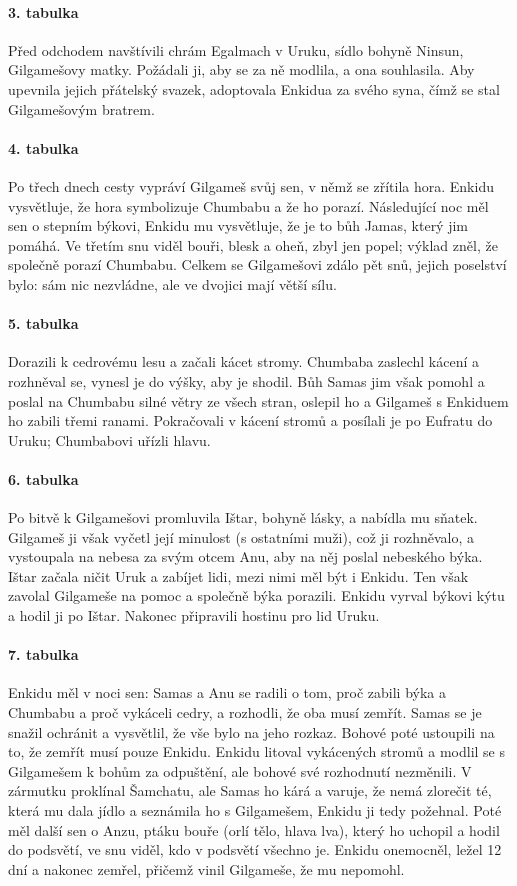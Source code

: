 \documentclass[12pt, a4paper]{article}
\begin{document}
\paragraph{3. tabulka}
Před odchodem navštívili chrám Egalmach v Uruku, sídlo bohyně Ninsun, Gilgamešovy matky. Požádali ji, aby se za ně modlila, a ona souhlasila. Aby upevnila jejich přátelský svazek, adoptovala Enkidua za svého syna, čímž se stal Gilgamešovým bratrem.

\paragraph{4. tabulka}
Po třech dnech cesty vypráví Gilgameš svůj sen, v němž se zřítila hora. Enkidu vysvětluje, že hora symbolizuje Chumbabu a že ho porazí. Následující noc měl sen o stepním býkovi, Enkidu mu vysvětluje, že je to bůh Jamas, který jim pomáhá. Ve třetím snu viděl bouři, blesk a oheň, zbyl jen popel; výklad zněl, že společně porazí Chumbabu. Celkem se Gilgamešovi zdálo pět snů, jejich poselství bylo: sám nic nezvládne, ale ve dvojici mají větší sílu.

\paragraph{5. tabulka}
Dorazili k cedrovému lesu a začali kácet stromy. Chumbaba zaslechl kácení a rozhněval se, vynesl je do výšky, aby je shodil. Bůh Samas jim však pomohl a poslal na Chumbabu silné větry ze všech stran, oslepil ho a Gilgameš s Enkiduem ho zabili třemi ranami. Pokračovali v kácení stromů a posílali je po Eufratu do Uruku; Chumbabovi uřízli hlavu.

\paragraph{6. tabulka}
Po bitvě k Gilgamešovi promluvila Ištar, bohyně lásky, a nabídla mu sňatek. Gilgameš ji však vyčetl její minulost (s ostatními muži), což ji rozhněvalo, a vystoupala na nebesa za svým otcem Anu, aby na něj poslal nebeského býka. Ištar začala ničit Uruk a zabíjet lidi, mezi nimi měl být i Enkidu. Ten však zavolal Gilgameše na pomoc a společně býka porazili. Enkidu vyrval býkovi kýtu a hodil ji po Ištar. Nakonec připravili hostinu pro lid Uruku.

\paragraph{7. tabulka}
Enkidu měl v noci sen: Samas a Anu se radili o tom, proč zabili býka a Chumbabu a proč vykáceli cedry, a rozhodli, že oba musí zemřít. Samas se je snažil ochránit a vysvětlil, že vše bylo na jeho rozkaz. Bohové poté ustoupili na to, že zemřít musí pouze Enkidu. Enkidu litoval vykácených stromů a modlil se s Gilgamešem k bohům za odpuštění, ale bohové své rozhodnutí nezměnili. V zármutku proklínal Šamchatu, ale Samas ho kárá a varuje, že nemá zlorečit té, která mu dala jídlo a seznámila ho s Gilgamešem, Enkidu ji tedy požehnal. Poté měl další sen o Anzu, ptáku bouře (orlí tělo, hlava lva), který ho uchopil a hodil do podsvětí, ve snu viděl, kdo v podsvětí všechno je. Enkidu onemocněl, ležel 12 dní a nakonec zemřel, přičemž vinil Gilgameše, že mu nepomohl.
\end{document}
